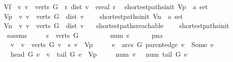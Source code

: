 \begin{isabellebody}
\ \ {\isachardoublequoteopen}V\isactrlsub f\ {\isasymequiv}\ {\isacharbraceleft}v{\isachardot}\ v\ {\isasymin}\ verts\ G\ {\isasymand}\ {\isacharparenleft}{\isasymexists}r{\isachardot}\ dist\ v\ {\isacharequal}\ ereal\ r{\isacharparenright}{\isacharbraceright}{\isachardoublequoteclose}\isanewline
\isanewline
{}\isamarkupfalse%
\ {\isacharparenleft}\ shortest{\isacharunderscore}paths{\isacharunderscore}init{\isacharparenright}\ V\isactrlsub p\ {\isacharcolon}{\isacharcolon}\ {\isachardoublequoteopen}{\isacharprime}a\ set{\isachardoublequoteclose}\ \isanewline
\ \ {\isachardoublequoteopen}V\isactrlsub p\ {\isasymequiv}\ {\isacharbraceleft}v{\isachardot}\ v\ {\isasymin}\ verts\ G\ {\isasymand}\ dist\ v\ {\isacharequal}\ {\isasyminfinity}{\isacharbraceright}{\isachardoublequoteclose}\isanewline
\isanewline
{}\isamarkupfalse%
\ {\isacharparenleft}\ shortest{\isacharunderscore}paths{\isacharunderscore}init{\isacharparenright}\ V\isactrlsub n\ {\isacharcolon}{\isacharcolon}\ {\isachardoublequoteopen}{\isacharprime}a\ set{\isachardoublequoteclose}\ \isanewline
\ \ {\isachardoublequoteopen}V\isactrlsub n\ {\isasymequiv}\ {\isacharbraceleft}v{\isachardot}\ v\ {\isasymin}\ verts\ G\ {\isasymand}\ dist\ v\ {\isacharequal}\ {\isacharminus}{\isasyminfinity}{\isacharbraceright}{\isachardoublequoteclose}\isanewline
\isanewline
{}\isamarkupfalse%
\ shortest{\isacharunderscore}paths{\isacharunderscore}reachable\ {\isacharequal}\ \isanewline
\ \ shortest{\isacharunderscore}paths{\isacharunderscore}init\ {\isacharplus}\isanewline
\ \ \ s{\isacharunderscore}assms{\isacharcolon}\ \isanewline
\ \ \ \ {\isachardoublequoteopen}s\ {\isasymin}\ verts\ G{\isachardoublequoteclose}\ \isanewline
\ \ \ \isanewline
\ \ \ \ {\isachardoublequoteopen}num\ s\ {\isacharequal}\ {}{\isachardoublequoteclose}\isanewline
\ \ \ \ pna{\isacharcolon}\ \isanewline
\ \ \ \ {\isachardoublequoteopen}{\isasymAnd}v{\isachardot}\ \ {\isasymlbrakk}v\ {\isasymin}\ verts\ G{\isacharsemicolon}\ v\ {\isasymnoteq}\ s{\isacharsemicolon}\ v\ {\isasymnotin}\ V\isactrlsub p{\isasymrbrakk}\ {\isasymLongrightarrow}\isanewline
\ \ \ \ {\isacharparenleft}{\isasymexists}e\ {\isasymin}\ arcs\ G{\isachardot}\ parent{\isacharunderscore}edge\ v\ {\isacharequal}\ Some\ e\ {\isasymand}\ \isanewline
\ \ \ \ head\ G\ e\ {\isacharequal}\ v\ {\isasymand}\ tail\ G\ e\ {\isasymnotin}\ V\isactrlsub p\ {\isasymand}\isanewline
\ \ \ \ num\ v\ \ {\isacharequal}\ num\ {\isacharparenleft}tail\ G\ e{\isacharparenright}\ {\isacharplus}\ {}{\isacharparenright}{\isachardoublequoteclose}\isanewline

\end{isabellebody}
